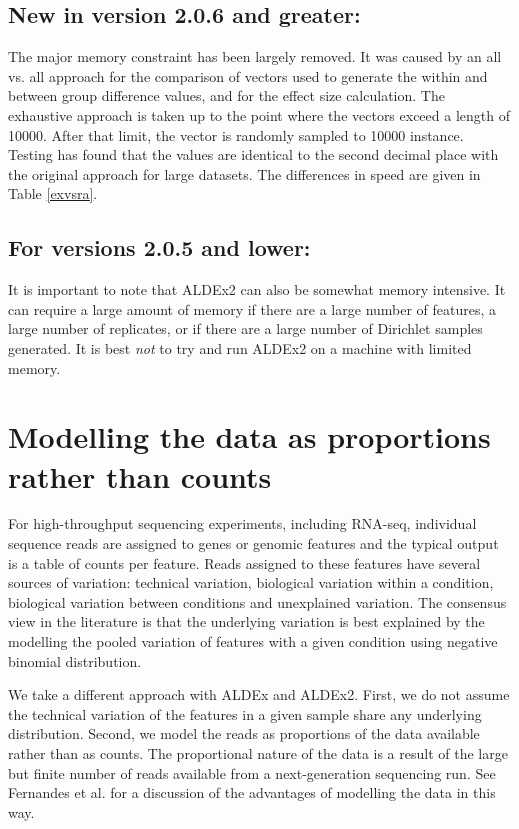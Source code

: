 \documentclass[11pt]{article}
\begin{document}
\subsection{New in version 2.0.6 and greater:} The major memory constraint has been largely removed. It was caused by an all vs. all approach for the comparison of vectors used to generate the within and between group difference values, and for the effect size calculation. The exhaustive approach is taken up to the point where the vectors exceed a length of 10000. After that limit, the vector is randomly sampled to 10000 instance. Testing has found that the values are identical to the second decimal place with the original approach for large datasets. The differences in speed are given in Table \ref{exvsra}.

\subsection{For versions 2.0.5 and lower:} It is important to note that ALDEx2 can also be somewhat memory intensive. It can require a large amount of memory if there are a large number of features, a large number of replicates, or if there are a large number of Dirichlet samples generated. It is best \emph{not} to try and run ALDEx2 on a machine with limited memory. 

\section{Modelling the data as proportions rather than counts}
For high-throughput sequencing experiments, including RNA-seq, individual sequence reads are assigned to genes or genomic features and the typical output is a table of counts per feature. Reads assigned to these features have several sources of variation: technical variation, biological variation within a condition, biological variation between conditions and unexplained variation. The consensus view in the literature is that the underlying variation is best explained by the modelling the pooled variation of  features with a given condition using negative binomial distribution. 

We take a different approach with ALDEx and ALDEx2. First, we do not assume the technical variation of the features in a given sample share any underlying distribution. Second, we model the reads as proportions  of the data available rather than as counts. The proportional nature of the data is a result of the large but finite number of reads available from a next-generation sequencing run. See Fernandes et al.\cite{fernandes:2013} for a discussion of the advantages of modelling the data in this way. 
\end{document}
